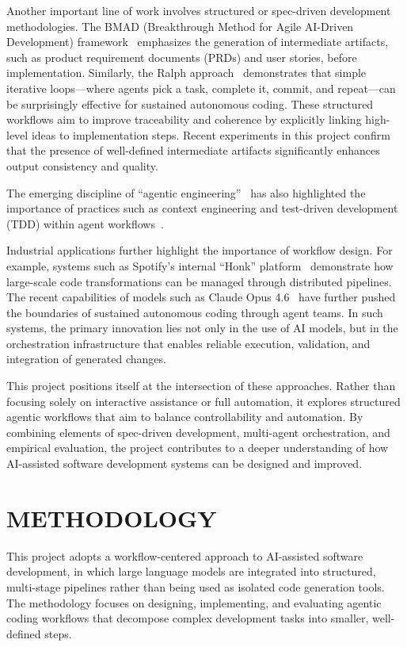 \documentclass[a4paper,12pt]{report}
\begin{document}
Another important line of work involves structured or spec-driven development methodologies. The BMAD (Breakthrough Method for Agile AI-Driven Development) framework~\cite{bmad,vidbmadtutorial} emphasizes the generation of intermediate artifacts, such as product requirement documents (PRDs) and user stories, before implementation. Similarly, the Ralph approach~\cite{ralph,vidralphpocock,vidralphisenberg} demonstrates that simple iterative loops---where agents pick a task, complete it, commit, and repeat---can be surprisingly effective for sustained autonomous coding. These structured workflows aim to improve traceability and coherence by explicitly linking high-level ideas to implementation steps. Recent experiments in this project confirm that the presence of well-defined intermediate artifacts significantly enhances output consistency and quality.

The emerging discipline of ``agentic engineering''~\cite{vidagenticengineering,vidclaudecodetips} has also highlighted the importance of practices such as context engineering and test-driven development (TDD) within agent workflows~\cite{vidtddagents,vidtddfireship}.

Industrial applications further highlight the importance of workflow design. For example, systems such as Spotify's internal ``Honk'' platform~\cite{spotifyhonk} demonstrate how large-scale code transformations can be managed through distributed pipelines. The recent capabilities of models such as Claude Opus 4.6~\cite{vidopus46} have further pushed the boundaries of sustained autonomous coding through agent teams. In such systems, the primary innovation lies not only in the use of AI models, but in the orchestration infrastructure that enables reliable execution, validation, and integration of generated changes.

This project positions itself at the intersection of these approaches. Rather than focusing solely on interactive assistance or full automation, it explores structured agentic workflows that aim to balance controllability and automation. By combining elements of spec-driven development, multi-agent orchestration, and empirical evaluation, the project contributes to a deeper understanding of how AI-assisted software development systems can be designed and improved.

\chapter{METHODOLOGY}
This project adopts a workflow-centered approach to AI-assisted software development, in which large language models are integrated into structured, multi-stage pipelines rather than being used as isolated code generation tools. The methodology focuses on designing, implementing, and evaluating agentic coding workflows that decompose complex development tasks into smaller, well-defined steps.
\end{document}
